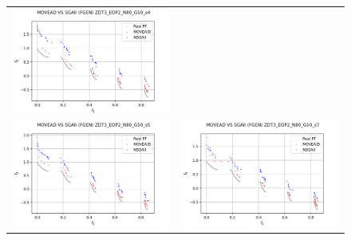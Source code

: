 \begin{figure}[H]
\begin{tabular}{c c}
    \includegraphics[scale=0.5]{figures/ZDT3_EOP2_N80_G50_T12/s4_comp.png}\\
    \includegraphics[scale=0.5]{figures/ZDT3_EOP2_N80_G50_T12/s5_comp.png} &
    \includegraphics[scale=0.5]{figures/ZDT3_EOP2_N80_G50_T12/s7_comp.png}\\

\end{tabular}
\end{figure}
